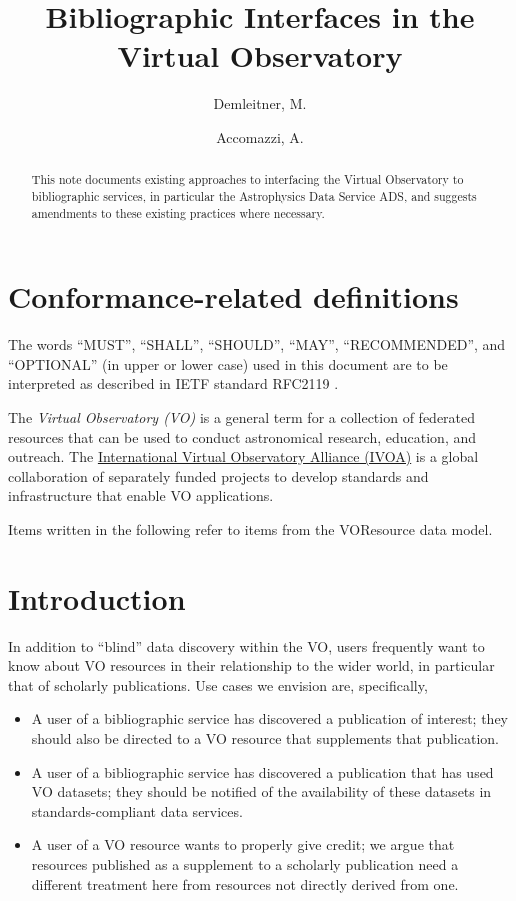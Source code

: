 \documentclass[11pt,a4paper]{ivoa}
\title{Bibliographic Interfaces in the Virtual Observatory}
\author[http://www.ivoa.net/cgi-bin/twiki/bin/view/IVOA/MarkusDemleitner]{Demleitner, M.}
\author{Accomazzi, A.}
\begin{document}
\begin{abstract}
This note documents existing approaches to interfacing the Virtual
Observatory to bibliographic services, in particular the Astrophysics
Data Service ADS, and suggests amendments to these existing practices
where necessary.
\end{abstract}


\section*{Conformance-related definitions}

The words ``MUST'', ``SHALL'', ``SHOULD'', ``MAY'', ``RECOMMENDED'', and
``OPTIONAL'' (in upper or lower case) used in this document are to be
interpreted as described in IETF standard RFC2119 \citep{std:RFC2119}.

The \emph{Virtual Observatory (VO)} is a
general term for a collection of federated resources that can be used
to conduct astronomical research, education, and outreach.
The \href{https://www.ivoa.net}{International
Virtual Observatory Alliance (IVOA)} is a global
collaboration of separately funded projects to develop standards and
infrastructure that enable VO applications.

Items written  in the following refer to items from
the VOResource data model.

\section{Introduction}

In addition to ``blind'' data discovery within the VO, users frequently
want to know about VO resources in their relationship to the wider
world, in particular that of scholarly publications.  Use cases we
envision are, specifically,

\begin{itemize}
\item A user of a bibliographic service has discovered a publication of
interest; they should also be directed to a VO resource that supplements
that publication.

\item A user of a bibliographic service has discovered a publication
that has used VO datasets; they should be notified of the availability
of these datasets in standards-compliant data services.

\item A user of a VO resource wants to properly give credit; we
argue that resources published as a supplement to a scholarly
publication need a different treatment here from resources not directly
derived from one.
\end{itemize}
\end{document}
